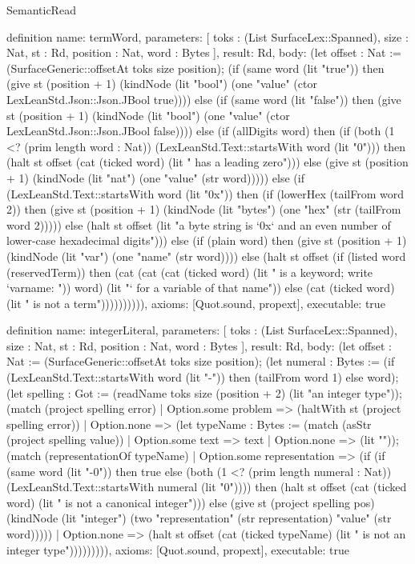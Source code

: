 \begin{lexlean}{SemanticRead}
\begin{semanticmodule}
definition{
  name: termWord,
  parameters: [
    toks : (List SurfaceLex::Spanned),
    size : Nat,
    st : Rd,
    position : Nat,
    word : Bytes
  ],
  result: Rd,
  body: (let offset : Nat := (SurfaceGeneric::offsetAt toks size position); (if (same word (lit "true")) then (give st (position + 1) (kindNode (lit "bool") (one "value" (ctor LexLeanStd.Json::Json.JBool true)))) else (if (same word (lit "false")) then (give st (position + 1) (kindNode (lit "bool") (one "value" (ctor LexLeanStd.Json::Json.JBool false)))) else (if (allDigits word) then (if (both (1 <? (prim length word : Nat)) (LexLeanStd.Text::startsWith word (lit "0"))) then (halt st offset (cat (ticked word) (lit " has a leading zero"))) else (give st (position + 1) (kindNode (lit "nat") (one "value" (str word))))) else (if (LexLeanStd.Text::startsWith word (lit "0x")) then (if (lowerHex (tailFrom word 2)) then (give st (position + 1) (kindNode (lit "bytes") (one "hex" (str (tailFrom word 2))))) else (halt st offset (lit "a byte string is `0x` and an even number of lower-case hexadecimal digits"))) else (if (plain word) then (give st (position + 1) (kindNode (lit "var") (one "name" (str word)))) else (halt st offset (if (listed word (reservedTerm)) then (cat (cat (cat (ticked word) (lit " is a keyword; write `var{name: ")) word) (lit "}` for a variable of that name")) else (cat (ticked word) (lit " is not a term")))))))))),
  axioms: [Quot.sound, propext],
  executable: true
}

definition{
  name: integerLiteral,
  parameters: [
    toks : (List SurfaceLex::Spanned),
    size : Nat,
    st : Rd,
    position : Nat,
    word : Bytes
  ],
  result: Rd,
  body: (let offset : Nat := (SurfaceGeneric::offsetAt toks size position); (let numeral : Bytes := (if (LexLeanStd.Text::startsWith word (lit "-")) then (tailFrom word 1) else word); (let spelling : Got := (readName toks size (position + 2) (lit "an integer type")); (match (project spelling error)
    | Option.some problem => (haltWith st (project spelling error))
    | Option.none => (let typeName : Bytes := (match (asStr (project spelling value))
      | Option.some text => text
      | Option.none => (lit "")); (match (representationOf typeName)
      | Option.some representation => (if (if (same word (lit "-0")) then true else (both (1 <? (prim length numeral : Nat)) (LexLeanStd.Text::startsWith numeral (lit "0")))) then (halt st offset (cat (ticked word) (lit " is not a canonical integer"))) else (give st (project spelling pos) (kindNode (lit "integer") (two "representation" (str representation) "value" (str word)))))
      | Option.none => (halt st offset (cat (ticked typeName) (lit " is not an integer type"))))))))),
  axioms: [Quot.sound, propext],
  executable: true
}


\end{semanticmodule}
\end{lexlean}
